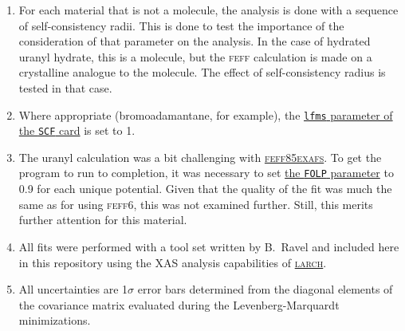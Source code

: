 \documentclass[11pt]{article}
\begin{document}
\begin{enumerate}
\item For each material that is not a molecule, the analysis is done
  with a sequence of self-consistency radii. This is done to test the
  importance of the consideration of that parameter on the analysis.
  In the case of hydrated uranyl hydrate, this is a molecule, but the
  \textsc{feff} calculation is made on a crystalline analogue to the
  molecule.  The effect of self-consistency radius is tested in that
  case.

\item Where appropriate (bromoadamantane, for example), the
  \href{http://leonardo.phys.washington.edu/feff/wiki/static/s/c/f/SCF_1ebb.html}{\texttt{lfms}
    parameter of the \texttt{SCF} card} is set to 1.

\item The uranyl calculation was a bit challenging with
  \href{https://github.com/xraypy/feff85exafs}{\textsc{feff85exafs}}. To
  get the program to run to completion, it was necessary to set
  \href{http://leonardo.phys.washington.edu/feff/wiki/static/f/o/l/FOLP_93fc.html}{the
    \texttt{FOLP} parameter} to 0.9 for each unique potential. Given that the
  quality of the fit was much the same as for using \textsc{feff6},
  this was not examined further.  Still, this merits further attention
  for this material.


\item All fits were performed with a tool set written by B.\ Ravel and
  included here in this repository using the XAS analysis capabilities
  of \href{https://github.com/xraypy/xraylarch/}{\textsc{larch}}.

\item All uncertainties are 1$\sigma$ error bars determined from the
  diagonal elements of the covariance matrix evaluated during the
  Levenberg-Marquardt minimizations.  


\end{enumerate}
\end{document}
